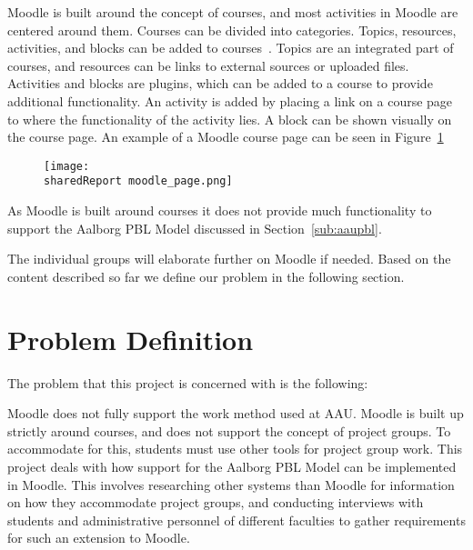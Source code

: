 Moodle is built around the concept of courses, and most activities in Moodle are centered around them.
Courses can be divided into categories.
Topics, resources, activities, and blocks can be added to courses~\citep{moodleStructural}.
Topics are an integrated part of courses, and resources can be links to external sources or uploaded files.
Activities and blocks are plugins, which can be added to a course to provide additional functionality.
An activity is added by placing a link on a course page to where the functionality of the activity lies.
A block can be shown visually on the course page.
An example of a Moodle course page can be seen in Figure~\ref{fig:MoodleCourse}

\begin{figure}
\texttt{[image: \\sharedReport moodle\_page.png]}
\label{fig:MoodleCourse}
\end{figure}

As Moodle is built around courses it does not provide much functionality to support the Aalborg PBL Model discussed in Section~\ref{sub:aaupbl}.

The individual groups will elaborate further on Moodle if needed.
Based on the content described so far we define our problem in the following section.
\newpage{}
\section{Problem Definition}
\label{sec:problemDef}
The problem that this project is concerned with is the following:

Moodle does not fully support the work method used at AAU.
Moodle is built up strictly around courses, and does not support the concept of project groups.
To accommodate for this, students must use other tools for project group work.
This project deals with how support for the Aalborg PBL Model can be implemented in Moodle.
This involves researching other systems than Moodle for information on how they accommodate project groups, and conducting interviews with students and administrative personnel of different faculties to gather requirements for such an extension to Moodle.